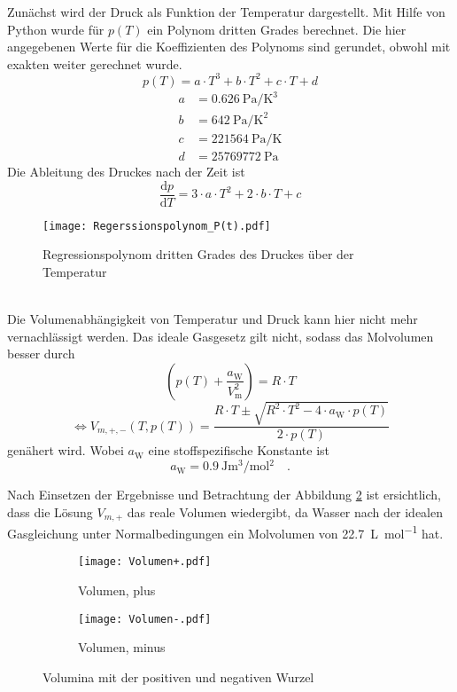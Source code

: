 Zunächst wird der Druck als Funktion der Temperatur dargestellt. Mit Hilfe von Python wurde für $p(T)$ ein Polynom dritten Grades berechnet. Die hier angegebenen Werte für die Koeffizienten des Polynoms sind gerundet, obwohl mit exakten weiter gerechnet wurde.
\begin{equation}
p(T) = a \cdot T ^3 + b \cdot T^2 +c \cdot T + d
\end{equation}
\begin{align}
a &=\SI{0.626}{\pascal\per\kelvin\cubed}  \\
b &= \SI[per-mode = fraction]{642}{\pascal\per\kelvin\squared}  \\
c &= \SI{221564}{\pascal\per\kelvin} \\
d  &= \SI{25769772}{\pascal}
\end{align}
Die Ableitung des Druckes nach der Zeit ist
\begin{equation}
\frac{\text{d} p}{\text{d} T} = 3 \cdot a \cdot T^2 + 2 \cdot b \cdot T + c
\end{equation}
\begin{figure}[h!]
	\centering
	\texttt{[image: Regerssionspolynom\_P(t).pdf]}
	\caption{Regressionspolynom dritten Grades des Druckes über der Temperatur}
	\label{fig:Regerssionspolynom_P(t)}
\end{figure}
\\

Die Volumenabhängigkeit von Temperatur und Druck kann hier nicht mehr vernachlässigt werden. Das ideale Gasgesetz gilt nicht, sodass das Molvolumen besser durch
\begin{equation}
\left( p(T) + \frac{a_\text{W}}{V_\text{m}^2}\right) = R \cdot T
\end{equation}
\begin{equation}
\Leftrightarrow
V_{m,+,-}(T, p(T)) = \frac{R \cdot T \pm \sqrt{R^2 \cdot T^2 - 4 \cdot a_\text{W} \cdot p(T)}}{2 \cdot p(T)}
\end{equation}
genähert wird. Wobei $a_\text{W}$ eine stoffspezifische Konstante ist
\begin{equation}
a_\text{W} = \SI{0.9}{\joule\metre^3\per\mol^2} \quad.
\end{equation}

 Nach Einsetzen der Ergebnisse und Betrachtung der Abbildung \ref{fig:volumen} ist ersichtlich, dass die Lösung $V_{m,+}$ das reale Volumen wiedergibt, da Wasser nach der idealen Gasgleichung unter Normalbedingungen ein Molvolumen von \SI{22.7}{\liter\per\mol} hat.
\begin{figure} 
	\centering
	\begin{subfigure}{\textwidth}
		\centering
		\texttt{[image: Volumen+.pdf]}
		\caption{Volumen, plus}
	\end{subfigure}
	\begin{subfigure}{\textwidth}
		\centering
		\texttt{[image: Volumen-.pdf]}
		\caption{Volumen, minus}
	\end{subfigure}
	\caption{Volumina mit der positiven und negativen Wurzel }
	\label{fig:volumen}
\end{figure}


